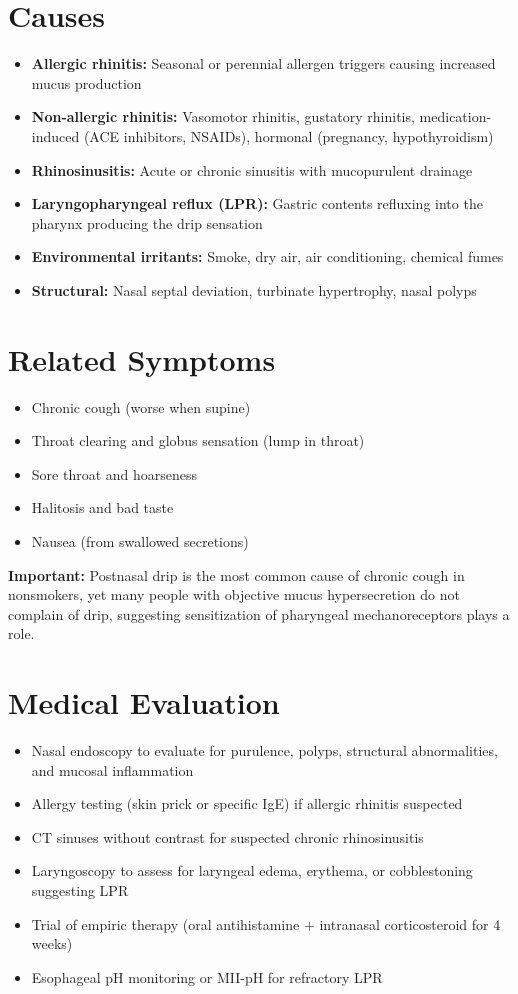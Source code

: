 \section*{Causes}
\begin{itemize}
  \item \textbf{Allergic rhinitis:} Seasonal or perennial allergen triggers causing increased mucus production
  \item \textbf{Non-allergic rhinitis:} Vasomotor rhinitis, gustatory rhinitis, medication-induced (ACE inhibitors, NSAIDs), hormonal (pregnancy, hypothyroidism)
  \item \textbf{Rhinosinusitis:} Acute or chronic sinusitis with mucopurulent drainage
  \item \textbf{Laryngopharyngeal reflux (LPR):} Gastric contents refluxing into the pharynx producing the drip sensation
  \item \textbf{Environmental irritants:} Smoke, dry air, air conditioning, chemical fumes
  \item \textbf{Structural:} Nasal septal deviation, turbinate hypertrophy, nasal polyps
\end{itemize}

\section*{Related Symptoms}
\begin{itemize}
  \item Chronic cough (worse when supine)
  \item Throat clearing and globus sensation (lump in throat)
  \item Sore throat and hoarseness
  \item Halitosis and bad taste
  \item Nausea (from swallowed secretions)
\end{itemize}
\textbf{Important:} Postnasal drip is the most common cause of chronic cough in nonsmokers, yet many people with objective mucus hypersecretion do not complain of drip, suggesting sensitization of pharyngeal mechanoreceptors plays a role.

\section*{Medical Evaluation}
\begin{itemize}
  \item Nasal endoscopy to evaluate for purulence, polyps, structural abnormalities, and mucosal inflammation
  \item Allergy testing (skin prick or specific IgE) if allergic rhinitis suspected
  \item CT sinuses without contrast for suspected chronic rhinosinusitis
  \item Laryngoscopy to assess for laryngeal edema, erythema, or cobblestoning suggesting LPR
  \item Trial of empiric therapy (oral antihistamine + intranasal corticosteroid for 4 weeks)
  \item Esophageal pH monitoring or MII-pH for refractory LPR
\end{itemize}

